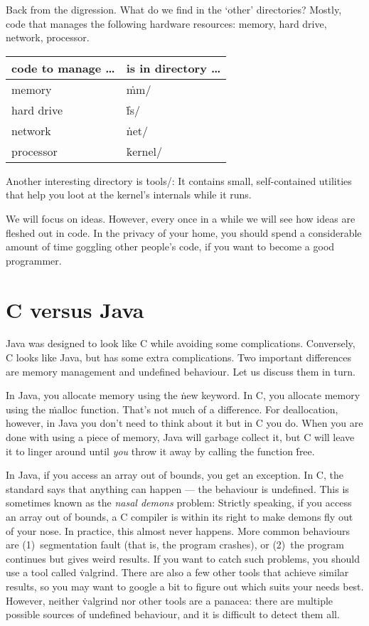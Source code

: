 \smallskip

Back from the digression.
What do we find in the `other' directories?
Mostly, code that manages the following hardware resources:
  memory, hard drive, network, processor.
\begin{center}
\begin{tabular}{@{}ll@{}}
\toprule
code to manage \dots & is in directory \dots \\
\midrule
memory & \.{mm/} \\
hard drive & \.{fs/} \\
network & \.{net/} \\
processor & \.{kernel/} \\
\bottomrule
\end{tabular}
\end{center}
Another interesting directory is \.{tools/}:
  It contains small, self-contained utilities
    that help you loot at the kernel's internals while it runs.

We will focus on ideas.
However,
  every once in a while we will see how ideas are fleshed out in code.
In the privacy of your home,
  you should spend a considerable amount of time goggling other people's code,
  if you want to become a good programmer.


\section{C versus Java}

Java was designed to look like C while avoiding some complications.
Conversely, C looks like Java, but has some extra complications.
Two important differences are memory management and undefined behaviour.
Let us discuss them in turn.

\smallskip

In Java, you allocate memory using the \.{new} keyword.
In C, you allocate memory using the \.{malloc} function.
That's not much of a difference.
For deallocation, however,
  in Java you don't need to think about it but in C you do.
When you are done with using a piece of memory,
  Java will garbage collect it,
  but C will leave it to linger around until \emph{you} throw it away
    by calling the function \.{free}.

\smallskip

In Java, if you access an array out of bounds, you get an exception.
In C, the standard says that anything can happen ---
  the behaviour is undefined.
This is sometimes known as the \emph{nasal demons} problem:
  Strictly speaking,
  if you access an array out of bounds,
  a C compiler is within its right to make demons fly out of your nose.
In practice, this almost never happens.
More common behaviours are
  (1)~segmentation fault (that is, the program crashes), or
  (2)~the program continues but gives weird results.
If you want to catch such problems,
  you should use a tool called \.{valgrind}.
There are also a few other tools that achieve similar results,
  so you may want to google a bit to figure out which suits your needs best.
However, neither \.{valgrind} nor other tools are a panacea:
  there are multiple possible sources of undefined behaviour,
  and it is difficult to detect them all.

